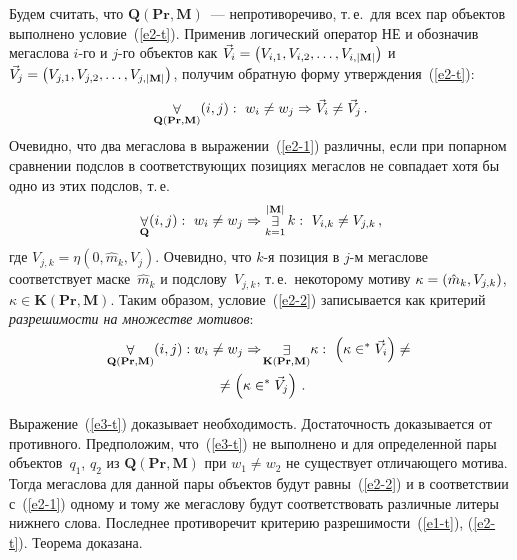 \begin{multicols}{2}
Будем считать, что $\mathbf{Q}(\mathbf{Pr}, \mathbf{M})$~--- непроти\-во\-речиво, т.\,е.\ для всех пар
объектов выполнено\linebreak
усло\-вие~(\ref{e2-t}). Применив логический оператор НЕ
и обозначив мегаслова $i$-го и $j$-го объектов как $\vec{V}_i\hm = \left(V_{i,1},
V_{i,2},\ldots , V_{i,\vert \mathbf{M}\vert}\right )$ и $\vec{V}_j\hm= \left(
V_{j,1},V_{j,2},\ldots , V_{j,\vert \mathbf{M}\vert}\right)$, получим обратную форму
утверждения~(\ref{e2-t}):
\addtocounter{equation}{-1}
\renewcommand{\theequation}{\arabic{equation}$^{\prime}$}
\begin{equation}
\mathop{\forall}\limits_{\mathbf{Q}(\mathbf{Pr},\mathbf{M})} (i,j):\ w_i\not= w_j\Rightarrow \vec{V}_i\not=
\vec{V}_j\,.
\label{e2-1}
\end{equation}
\renewcommand{\theequation}{\arabic{equation}}
\setcounter{equation}{1}
Очевидно, что два мегаслова в выражении~(\ref{e2-1}) различны, если при
попарном сравнении подслов в соответствующих позициях мегаслов не
совпадает хотя бы одно из этих подслов, т.\,е.
\setcounter{equation}{1}
\renewcommand{\theequation}{\arabic{equation}$^{\prime\prime}$}
\begin{equation}
\forallb\limits_\mathbf{Q} (i,j):\ w_i\not=w_j\Rightarrow
\existsb\limits_{k=1}^{\vert \mathbf{M}\vert } k:\ V_{i,k}\not= V_{j,k}\,,
\label{e2-2}
\end{equation}
где $V_{j,k}=\eta(0,\hat{m}_k,V_j)$. Очевидно, что $k$-я позиция в $j$-м
мегаслове соответствует маске~$\hat{m}_k$ и подслову~$V_{j,k}$, т.\,е.\
некоторому мотиву $\kappa \hm=(\hat{m}_k,V_{j,k})$, $\kappa \in \mathbf{K}(\mathbf{Pr},\mathbf{M})$.
Таким образом, условие~(\ref{e2-2}) записывается как критерий
\textit{разрешимости на множестве мотивов}:
\renewcommand{\theequation}{\arabic{equation}}
\setcounter{equation}{2}
\begin{multline}
\mathop{\forall}\limits_{\mathbf{Q}(\mathbf{Pr},\mathbf{M})} (i,j): w_i\not=w_j\Rightarrow\!
\mathop{\exists}\limits_{\mathbf{K}(\mathbf{Pr},\mathbf{M})} \!\kappa:\
\left (\kappa\in^* \vec{V}_i\right)\not= {}\\
{}\not=
\left(\kappa\in^* \vec{V}_j\right)\,.
\label{e3-t}
\end{multline}

Выражение~(\ref{e3-t}) доказывает необходимость. Достаточность
доказывается от противного. Предположим, что~(\ref{e3-t}) не выполнено и
для определенной пары объектов~$q_1$, $q_2$ из $\mathbf{Q}(\mathbf{Pr}, \mathbf{M})$
при  $w_1\not= w_2$ не существует отличающего мотива. Тогда мегаслова для данной пары
объектов будут равны~(\ref{e2-2}) и в соответствии с~(\ref{e2-1}) одному и
тому же мегаслову будут соответствовать различные литеры нижнего слова.
Последнее противоречит критерию разрешимости~(\ref{e1-t}), (\ref{e2-t}).
Теорема доказана.
\medskip


\end{multicols}
